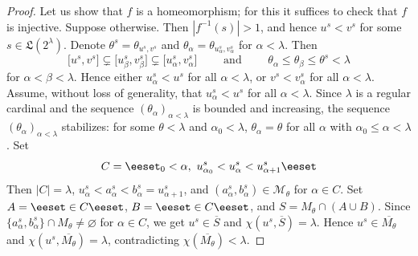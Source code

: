 \documentclass[10pt,a4paper]{amsart}
\def\B{2}
\def\al{\alpha}
\def\bbset#1:#2\eeset{\{#1\,:\,#2\}}
\def\be{\beta}
\def\cM{{\mathcal M}}
\def\cl#1{\overline{#1}}
\def\es{\varnothing}
\def\ilcc[#1,#2]{\ilsymlc#1\ilcomma/ #2\ilsymrc}
\def\ilcomma/{\boldsymbol{,}}
\def\ilsymlc{\boldsymbol{[}}
\def\ilsymrc{\boldsymbol{]}}
\def\la{\lambda}
\def\lex#1#2{\mathfrak{L}(#2^{#1})}
\def\lexab{\lex\la\B}
\def\set#1{\bbset#1\eeset}
\def\sq#1#2{(#1)_{#2}}
\def\sset#1{\{#1\}}
\def\te{\theta}
\begin{document}
\begin{proof}
Let us show that $f$ is a homeomorphism; for this it suffices to check that $f$ is injective. Suppose otherwise. Then $|f^{-1}(s)|>1$, and hence $u^s<v^s$ for some $s\in\lexab$.
%
Denote $\te^s=\te_{u^s,v^s}$ and $\te_\al=\te_{u_\al^s,v_\al^s}$ for $\al<\la$.
Then
\[
\ilcc[u^s,v^s] \subsetneq \ilcc[u^s_\be,v^s_\be] \subsetneq \ilcc[u^s_\al,v^s_\al]
\qquad\text{ and } \qquad \te_\al\leq \te_\be\leq  \te^s < \la
\]
for $\al< \be < \la$. 
Hence either $u^s_\al<u^s$ for all $\al<\la$, or $v^s<v^s_\al$ for all $\al<\la$. Assume, without loss of generality, that $u^s_\al<u^s$ for all $\al<\la$.
Since $\la$ is a regular cardinal and the sequence $\sq{\te_\al}{\al<\la}$ is bounded and increasing, the sequence $\sq{\te_\al}{\al<\la}$ stabilizes: for some $\te<\la$ and $\al_0<\la$, $\te_\al=\te$ for all $\al$ with $\al_0\leq \al < \la$. Set
\[
C=\set{ \al<\la: \al_0<\al,\ u^s_{\al_0} < u^s_{\al} < u^s_{\al+1} }
\]
Then $|C|=\la$, $u^s_{\al} < a^s_\al< b^s_\al=u^s_{\al+1}$, and $(a^s_\al,b^s_\al)\in \cM_\te$ for $\al\in C$.
Set $A=\set{a^s_\al:\al\in C}$, $B=\set{b^s_\al:\al\in C}$, and $S=M_\te\cap(A\cup B)$. Since $\sset{a^s_\al,b^s_\al}\cap M_\te\neq\es$ for $\al\in C$, we get $u^s\in \cl S$ and $\chi(u^s,\cl S)=\la$. Hence $u^s\in \cl{M_\te}$ and $\chi(u^s,\cl{M_\te})=\la$, contradicting $\chi(\cl{M_\te})<\la$.
\end{proof}
\end{document}
